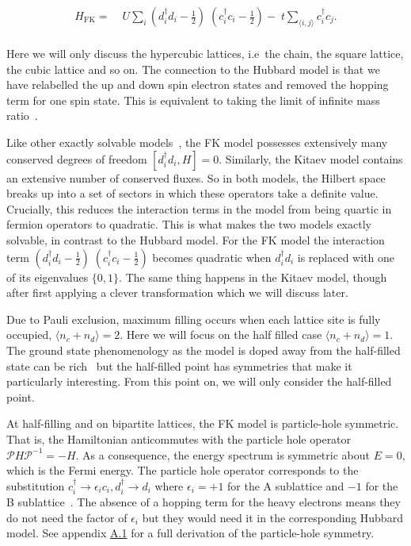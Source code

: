 \[\begin{aligned}
H_{\mathrm{FK}} = & \;U \sum_{i} (d^\dagger_{i}d_{i} - \tfrac{1}{2})\;(c^\dagger_{i}c_{i} - \tfrac{1}{2}) -\;t \sum_{\langle i,j\rangle} c^\dagger_{i}c_{j}.\\ 
\end{aligned}\]

Here we will only discuss the hypercubic lattices, i.e~the chain, the square lattice, the cubic lattice and so on. The connection to the Hubbard model is that we have relabelled the up and down spin electron states and removed the hopping term for one spin state. This is equivalent to taking the limit of infinite mass ratio~\autocite{devriesSimplifiedHubbardModel1993}.

Like other exactly solvable models~\autocite{smithDisorderFreeLocalization2017}, the FK model possesses extensively many conserved degrees of freedom \([d^\dagger_{i}d_{i}, H] = 0\). Similarly, the Kitaev model contains an extensive number of conserved fluxes. So in both models, the Hilbert space breaks up into a set of sectors in which these operators take a definite value. Crucially, this reduces the interaction terms in the model from being quartic in fermion operators to quadratic. This is what makes the two models exactly solvable, in contrast to the Hubbard model. For the FK model the interaction term \((d^\dagger_{i}d_{i} - \tfrac{1}{2})\;(c^\dagger_{i}c_{i} - \tfrac{1}{2})\) becomes quadratic when \(d^\dagger_{i}d_{i}\) is replaced with one of its eigenvalues \(\{0,1\}\). The same thing happens in the Kitaev model, though after first applying a clever transformation which we will discuss later.

Due to Pauli exclusion, maximum filling occurs when each lattice site is fully occupied, \(\langle n_c + n_d \rangle = 2\). Here we will focus on the half filled case \(\langle n_c + n_d \rangle = 1\). The ground state phenomenology as the model is doped away from the half-filled state can be rich~\autocite{jedrzejewskiFalicovKimballModels2001,gruberGroundStatesSpinless1990} but the half-filled point has symmetries that make it particularly interesting. From this point on, we will only consider the half-filled point.

At half-filling and on bipartite lattices, the FK model is particle-hole symmetric. That is, the Hamiltonian anticommutes with the particle hole operator \(\mathcal{P}H\mathcal{P}^{-1} = -H\). As a consequence, the energy spectrum is symmetric about \(E = 0\), which is the Fermi energy. The particle hole operator corresponds to the substitution \(c^\dagger_i \rightarrow \epsilon_i c_i, d^\dagger_i \rightarrow d_i\) where \(\epsilon_i = +1\) for the A sublattice and \(-1\) for the B sublattice~\autocite{gruberFalicovKimballModel2006}. The absence of a hopping term for the heavy electrons means they do not need the factor of \(\epsilon_i\) but they would need it in the corresponding Hubbard model. See appendix \protect\hyperlink{particle-hole-symmetry}{A.1} for a full derivation of the particle-hole symmetry.

